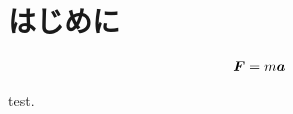 \documentclass[dvipdfmx,a4j,11pt]{jsarticle}
\begin{document}

\newpage 
\tableofcontents
\newpage

\section*{はじめに}

\begin{align}
  \vb*{F} = m \vb*{a}
\end{align}

test\cite{name}.

\printbibliography[title=参考文献] %
\end{document}
